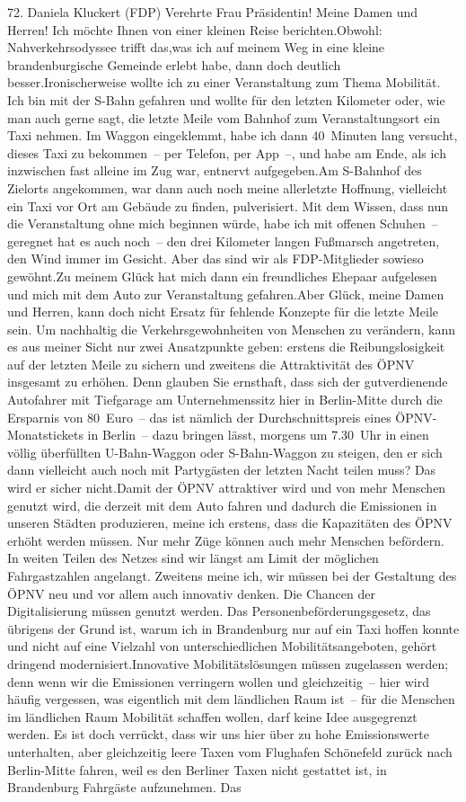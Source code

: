 \documentclass{article}
\begin{document}
	72. Daniela Kluckert (FDP) Verehrte Frau Präsidentin! Meine Damen und Herren! Ich möchte Ihnen von einer kleinen Reise berichten.Obwohl: Nahverkehrsodyssee trifft das,was ich auf meinem Weg in eine kleine brandenburgische Gemeinde erlebt habe, dann doch deutlich besser.Ironischerweise wollte ich zu einer Veranstaltung zum Thema Mobilität. Ich bin mit der S-Bahn gefahren und wollte für den letzten Kilometer oder, wie man auch gerne sagt, die letzte Meile vom Bahnhof zum Veranstaltungsort ein Taxi nehmen. Im Waggon eingeklemmt, habe ich dann 40 Minuten lang versucht, dieses Taxi zu bekommen – per Telefon, per App –, und habe am Ende, als ich inzwischen fast alleine im Zug war, entnervt aufgegeben.Am S-Bahnhof des Zielorts angekommen, war dann auch noch meine allerletzte Hoffnung, vielleicht ein Taxi vor Ort am Gebäude zu finden, pulverisiert. Mit dem Wissen, dass nun die Veranstaltung ohne mich beginnen würde, habe ich mit offenen Schuhen – geregnet hat es auch noch – den drei Kilometer langen Fußmarsch angetreten, den Wind immer im Gesicht. Aber das sind wir als FDP-Mitglieder sowieso gewöhnt.Zu meinem Glück hat mich dann ein freundliches Ehepaar aufgelesen und mich mit dem Auto zur Veranstaltung gefahren.Aber Glück, meine Damen und Herren, kann doch nicht Ersatz für fehlende Konzepte für die letzte Meile sein. Um nachhaltig die Verkehrsgewohnheiten von Menschen zu verändern, kann es aus meiner Sicht nur zwei Ansatzpunkte geben: erstens die Reibungslosigkeit auf der letzten Meile zu sichern und zweitens die Attraktivität des ÖPNV insgesamt zu erhöhen. Denn glauben Sie ernsthaft, dass sich der gutverdienende Autofahrer mit Tiefgarage am Unternehmenssitz hier in Berlin-Mitte durch die Ersparnis von 80 Euro – das ist nämlich der Durchschnittspreis eines ÖPNV-Monatstickets in Berlin – dazu bringen lässt, morgens um 7.30 Uhr in einen völlig überfüllten U-Bahn-Waggon oder S-Bahn-Waggon zu steigen, den er sich dann vielleicht auch noch mit Partygästen der letzten Nacht teilen muss? Das wird er sicher nicht.Damit der ÖPNV attraktiver wird und von mehr Menschen genutzt wird, die derzeit mit dem Auto fahren und dadurch die Emissionen in unseren Städten produzieren, meine ich erstens, dass die Kapazitäten des ÖPNV erhöht werden müssen. Nur mehr Züge können auch mehr Menschen befördern. In weiten Teilen des Netzes sind wir längst am Limit der möglichen Fahrgastzahlen angelangt. Zweitens meine ich, wir müssen bei der Gestaltung des ÖPNV neu und vor allem auch innovativ denken. Die Chancen der Digitalisierung müssen genutzt werden. Das Personenbeförderungsgesetz, das übrigens der Grund ist, warum ich in Brandenburg nur auf ein Taxi hoffen konnte und nicht auf eine Vielzahl von unterschiedlichen Mobilitätsangeboten, gehört dringend modernisiert.Innovative Mobilitätslösungen müssen zugelassen werden; denn wenn wir die Emissionen verringern wollen und gleichzeitig – hier wird häufig vergessen, was eigentlich mit dem ländlichen Raum ist – für die Menschen im ländlichen Raum Mobilität schaffen wollen, darf keine Idee ausgegrenzt werden. Es ist doch verrückt, dass wir uns hier über zu hohe Emissionswerte unterhalten, aber gleichzeitig leere Taxen vom Flughafen Schönefeld zurück nach Berlin-Mitte fahren, weil es den Berliner Taxen nicht gestattet ist, in Brandenburg Fahrgäste aufzunehmen. Das 
\end{document}
